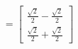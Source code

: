 \documentclass[preview]{standalone}
\begin{document}
\begin{align*}
=\begin{bmatrix}\frac{\sqrt{2}}{2}-\frac{\sqrt{2}}{2}\\\frac{\sqrt{2}}{2}+\frac{\sqrt{2}}{2}\end{bmatrix}
\end{align*}
\end{document}
